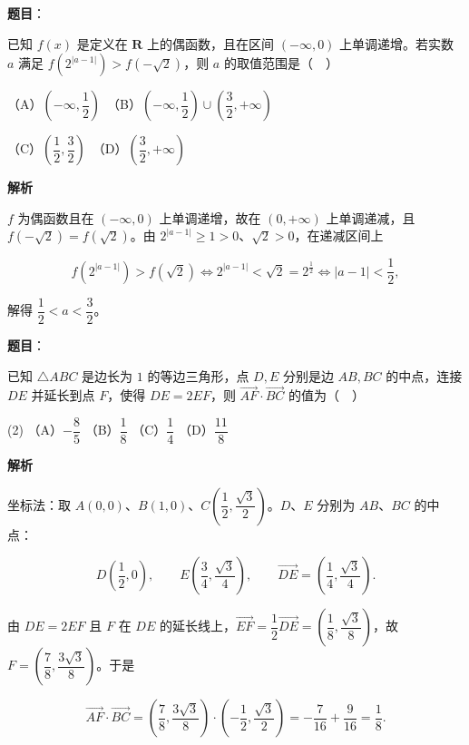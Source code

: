 \begin{answer}

\textbf{题目}：

已知 \(f(x)\) 是定义在 \(\mathbf{R}\) 上的偶函数，且在区间 \((-\infty,0)\) 上单调递增。若实数 \(a\) 满足 \(f\left(2^{|a-1|}\right)>f\left(-\sqrt{2}\right)\)，则 \(a\) 的取值范围是（　）

（A）\(\left(-\infty,\dfrac{1}{2}\right)\)　（B）\(\left(-\infty,\dfrac{1}{2}\right)\cup\left(\dfrac{3}{2},+\infty\right)\)

（C）\(\left(\dfrac{1}{2},\dfrac{3}{2}\right)\)　（D）\(\left(\dfrac{3}{2},+\infty\right)\)

\textbf{解析}

\(f\) 为偶函数且在 \((-\infty,0)\) 上单调递增，故在 \((0,+\infty)\) 上单调递减，且 \(f(-\sqrt{2})=f(\sqrt{2})\)。由 \(2^{|a-1|}\geqslant 1>0\)、\(\sqrt{2}>0\)，在递减区间上

\nopagebreak[4]
\[
f\left(2^{|a-1|}\right)>f\left(\sqrt{2}\right)\iff 2^{|a-1|}<\sqrt{2}=2^{\frac{1}{2}}\iff |a-1|<\dfrac{1}{2},
\]

解得 \(\dfrac{1}{2}<a<\dfrac{3}{2}\)。


\end{answer}
\begin{answer}

\textbf{题目}：

已知 \(\triangle ABC\) 是边长为 \(1\) 的等边三角形，点 \(D,E\) 分别是边 \(AB,BC\) 的中点，连接 \(DE\) 并延长到点 \(F\)，使得 \(DE=2EF\)，则 \(\overrightarrow{AF}\cdot\overrightarrow{BC}\) 的值为（　）

\begin{gkopts}(2)
\task （A）\(-\dfrac{8}{5}\)
\task （B）\(\dfrac{1}{8}\)
\task （C）\(\dfrac{1}{4}\)
\task （D）\(\dfrac{11}{8}\)
\end{gkopts}

\textbf{解析}

坐标法：取 \(A(0,0)\)、\(B(1,0)\)、\(C\left(\dfrac{1}{2},\dfrac{\sqrt{3}}{2}\right)\)。\(D\)、\(E\) 分别为 \(AB\)、\(BC\) 的中点：

\nopagebreak[4]
\[
D\left(\dfrac{1}{2},0\right),\qquad E\left(\dfrac{3}{4},\dfrac{\sqrt{3}}{4}\right),\qquad \overrightarrow{DE}=\left(\dfrac{1}{4},\dfrac{\sqrt{3}}{4}\right).
\]

由 \(DE=2EF\) 且 \(F\) 在 \(DE\) 的延长线上，\(\overrightarrow{EF}=\dfrac{1}{2}\overrightarrow{DE}=\left(\dfrac{1}{8},\dfrac{\sqrt{3}}{8}\right)\)，故 \(F=\left(\dfrac{7}{8},\dfrac{3\sqrt{3}}{8}\right)\)。于是

\nopagebreak[4]
\[
\overrightarrow{AF}\cdot\overrightarrow{BC}=\left(\dfrac{7}{8},\dfrac{3\sqrt{3}}{8}\right)\cdot\left(-\dfrac{1}{2},\dfrac{\sqrt{3}}{2}\right)=-\dfrac{7}{16}+\dfrac{9}{16}=\dfrac{1}{8}.
\]


\end{answer}
